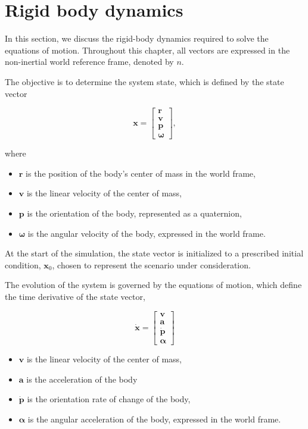 \documentclass{article}
\begin{document}
	\section{Rigid body dynamics}
	\label{sec:dynamics}
	In this section, we discuss the rigid-body dynamics required to solve the equations of motion. Throughout this chapter, all vectors are expressed in the non-inertial world reference frame, denoted by $n$.
	
	The objective is to determine the system state, which is defined by the state vector
	
	\[
	\mathbf{x} =
	\begin{bmatrix}
		\mathbf{r} \\
		\mathbf{v} \\
		\mathbf{p} \\
		\boldsymbol{\omega}
	\end{bmatrix},
	\]
	
	where
	\begin{itemize}
		\item $\mathbf{r}$ is the position of the body's center of mass in the world frame,
		\item $\mathbf{v}$ is the linear velocity of the center of mass,
		\item $\mathbf{p}$ is the orientation of the body, represented as a quaternion,
		\item $\boldsymbol{\omega}$ is the angular velocity of the body, expressed in the world frame.
	\end{itemize}
	
	At the start of the simulation, the state vector is initialized to a prescribed initial condition, $\mathbf{x}_0$, chosen to represent the scenario under consideration.
	
	The evolution of the system is governed by the equations of motion, which define the time derivative of the state vector,
	
	\[
	\dot{\mathbf{x}} =
	\begin{bmatrix}
		{\mathbf{v}} \\
		{\mathbf{a}} \\
		\dot{{\mathbf{p}}} \\
		\boldsymbol{\alpha}
	\end{bmatrix}
	\]
	
	\begin{itemize}
	\item $\mathbf{v}$ is the linear velocity of the center of mass,
	\item $\mathbf{a}$ is the acceleration of the body
	\item $\dot{\mathbf{p}}$ is the orientation rate of change of the body,
	\item $\boldsymbol{\alpha}$ is the angular acceleration of the body, expressed in the world frame.
\end{itemize}
	
\end{document}
